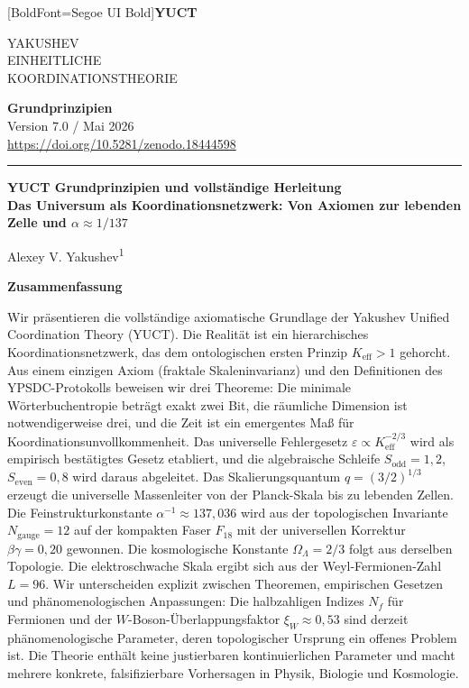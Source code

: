 \documentclass[12pt,a4paper]{article}
\newcommand{\makeheader}{%
	\noindent
	\begin{minipage}{0.17\textwidth}
		\raggedright
		{\fontspec{Segoe UI}[BoldFont=Segoe UI Bold]\bfseries\color{skyblue}\fontsize{46}{46}\selectfont YUCT}%
	\end{minipage}%
	\hspace{30pt}
	\begin{minipage}{0.32\textwidth}
		\raggedright
		{\sffamily\fontsize{11}{13}\selectfont YAKUSHEV\\ EINHEITLICHE\\ KOORDINATIONSTHEORIE}%
	\end{minipage}%
	\hfill
	\begin{minipage}{0.38\textwidth}
		\raggedleft
		{\sffamily\bfseries Grundprinzipien}\\ 
		{\sffamily Version 7.0 / Mai 2026}\\ 
		{\sffamily\footnotesize \scriptsize\url{https://doi.org/10.5281/zenodo.18444598}}%
	\end{minipage}
	\par\vspace{5pt}
	\noindent\textcolor{gold}{\rule{\textwidth}{1.6pt}}
	\par\vspace{0pt}
}
\begin{document}
	
	\thispagestyle{firstpage}
	\makeheader
	
	\vspace{0cm}
	{\LARGE\bfseries YUCT Grundprinzipien und vollständige Herleitung \\
		\Large Das Universum als Koordinationsnetzwerk: Von Axiomen zur lebenden Zelle und \(\alpha \approx 1/137\) \par}
	\vspace{0.2cm}
	
	{\large Alexey V. Yakushev\textsuperscript{1}} \\
	\vspace{0.0cm}
	
	{\color{darkblue}\textbf{\LARGE Zusammenfassung}} \par
	{\large
		\noindent
		Wir präsentieren die vollständige axiomatische Grundlage der Yakushev Unified Coordination Theory (YUCT). Die Realität ist ein hierarchisches Koordinationsnetzwerk, das dem ontologischen ersten Prinzip \(K_{\mathrm{eff}} > 1\) gehorcht. Aus einem einzigen Axiom (fraktale Skaleninvarianz) und den Definitionen des YPSDC-Protokolls beweisen wir drei Theoreme: Die minimale Wörterbuchentropie beträgt exakt zwei Bit, die räumliche Dimension ist notwendigerweise drei, und die Zeit ist ein emergentes Maß für Koordinationsunvollkommenheit. Das universelle Fehlergesetz \(\varepsilon \propto K_{\mathrm{eff}}^{-2/3}\) wird als empirisch bestätigtes Gesetz etabliert, und die algebraische Schleife \(S_{\mathrm{odd}} = 1,2\), \(S_{\mathrm{even}} = 0,8\) wird daraus abgeleitet. Das Skalierungsquantum \(q = (3/2)^{1/3}\) erzeugt die universelle Massenleiter von der Planck-Skala bis zu lebenden Zellen. Die Feinstrukturkonstante \(\alpha^{-1} \approx 137,036\) wird aus der topologischen Invariante \(N_{\mathrm{gauge}} = 12\) auf der kompakten Faser \(F_{18}\) mit der universellen Korrektur \(\beta\gamma = 0,20\) gewonnen. Die kosmologische Konstante \(\Omega_\Lambda = 2/3\) folgt aus derselben Topologie. Die elektroschwache Skala ergibt sich aus der Weyl-Fermionen-Zahl \(L = 96\). Wir unterscheiden explizit zwischen Theoremen, empirischen Gesetzen und phänomenologischen Anpassungen: Die halbzahligen Indizes \(N_f\) für Fermionen und der \(W\)-Boson-Überlappungsfaktor \(\xi_W \approx 0,53\) sind derzeit phänomenologische Parameter, deren topologischer Ursprung ein offenes Problem ist. Die Theorie enthält keine justierbaren kontinuierlichen Parameter und macht mehrere konkrete, falsifizierbare Vorhersagen in Physik, Biologie und Kosmologie.
	}
	
\end{document}
